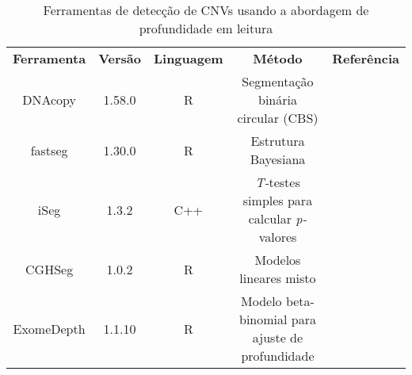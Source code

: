 
\begin{table}[h]
 \centering
 {\renewcommand\arraystretch{1.25}
 \caption{Ferramentas de detecção de CNVs usando a abordagem de profundidade em leitura\label{qua:ferramentas-de-deteccao-de-cnv}}
 \begin{adjustbox}{max width=\textwidth}
\begin{tabular}{ l l l l l }
  \cline{1-1}\cline{2-2}\cline{3-3}\cline{4-4}\cline{5-5}  
    \multicolumn{1}{|c|}{\textbf{\textcolor{color000000}{Ferramenta}}} &
    \multicolumn{1}{c|}{\textbf{\textcolor{color000000}{Versão}}} &
    \multicolumn{1}{c|}{\textbf{\textcolor{color000000}{Linguagem}}} &
    \multicolumn{1}{c|}{\textbf{\textcolor{color000000}{Método}}} &
    \multicolumn{1}{c|}{\textbf{Referência}}
  \\  
  \cline{1-1}\cline{2-2}\cline{3-3}\cline{4-4}\cline{5-5}  
    \multicolumn{1}{|c|}{DNAcopy} &
    \multicolumn{1}{c|}{1.58.0} &
    \multicolumn{1}{c|}{R} &
    \multicolumn{1}{c|}{Segmentação binária circular (CBS)} &
    \multicolumn{1}{c|}{\cite{Olshen2004}}
  \\  
  \cline{1-1}\cline{2-2}\cline{3-3}\cline{4-4}\cline{5-5}  
    \multicolumn{1}{|c|}{fastseg} &
    \multicolumn{1}{c|}{1.30.0} &
    \multicolumn{1}{c|}{R} &
    \multicolumn{1}{c|}{Estrutura Bayesiana} &
    \multicolumn{1}{c|}{\cite{Baldi2001}}
  \\  
  \cline{1-1}\cline{2-2}\cline{3-3}\cline{4-4}\cline{5-5}  
    \multicolumn{1}{|c|}{iSeg} &
    \multicolumn{1}{c|}{1.3.2} &
    \multicolumn{1}{c|}{C++} &
    \multicolumn{1}{c|}{\textit{T-}testes simples para calcular \textit{p-}valores} &
    \multicolumn{1}{c|}{\cite{Girimurugan2018}}
  \\  
  \cline{1-1}\cline{2-2}\cline{3-3}\cline{4-4}\cline{5-5}  
    \multicolumn{1}{|c|}{CGHSeg} &
    \multicolumn{1}{c|}{1.0.2} &
    \multicolumn{1}{c|}{R} &
    \multicolumn{1}{c|}{Modelos lineares misto} &
    \multicolumn{1}{c|}{\cite{Picard2011}}
  \\
  \cline{1-1}\cline{2-2}\cline{3-3}\cline{4-4}\cline{5-5}  
    \multicolumn{1}{|c|}{ExomeDepth} &
    \multicolumn{1}{c|}{1.1.10} &
    \multicolumn{1}{c|}{R} &
    \multicolumn{1}{c|}{Modelo beta-binomial para ajuste de profundidade} &
    \multicolumn{1}{c|}{\cite{Plagnol2012}}
  \\ 
  \hline

 \end{tabular}
 \end{adjustbox}}
\end{table}